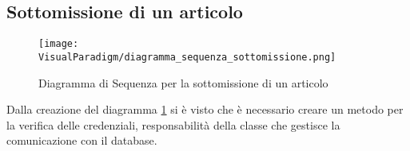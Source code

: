\subsection{Sottomissione di un articolo}
\label{sec:sequenza_sottomissione}
\begin{figure}[ht]
  \centering
  \texttt{[image: VisualParadigm/diagramma\_sequenza\_sottomissione.png]}
  \caption{Diagramma di Sequenza per la sottomissione di un articolo}
  \label{fig:sottomissione}
\end{figure}

Dalla creazione del diagramma \ref{fig:sottomissione} si è visto che è
necessario creare un metodo per la verifica delle credenziali,
responsabilità della classe che gestisce la comunicazione con il
database.

